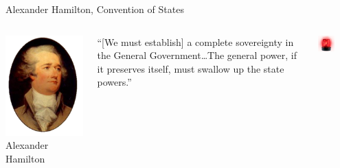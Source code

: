 \begin{frame}{Alexander Hamilton, Convention of States}
    \begin{columns}[onlytextwidth]
            \centering
            \includegraphics[height=0.75\textheight]{img/hamilton.png} \\
            Alexander Hamilton \\

            \begin{block}{}
                ``[We must establish] a complete sovereignty in the General Government\ldots The general power, if it preserves itself, must swallow up the state powers.''
            \end{block}
            \pause
            {
                \centering
                \includegraphics[width=0.5\textwidth]{img/red-light.png} \\
            }
    \end{columns}
\end{frame}

